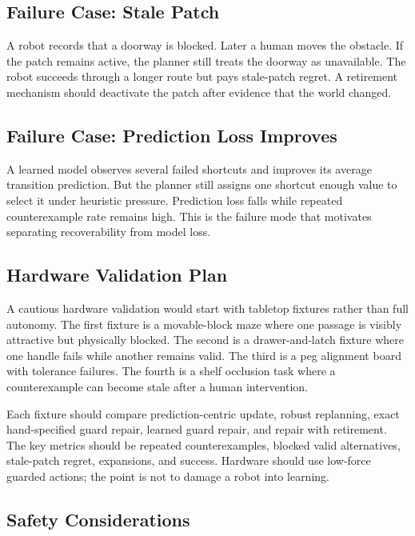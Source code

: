 \documentclass{article}
\begin{document}
\subsection{Failure Case: Stale Patch}

A robot records that a doorway is blocked. Later a human moves the obstacle. If
the patch remains active, the planner still treats the doorway as unavailable.
The robot succeeds through a longer route but pays stale-patch regret. A
retirement mechanism should deactivate the patch after evidence that the world
changed.

\subsection{Failure Case: Prediction Loss Improves}

A learned model observes several failed shortcuts and improves its average
transition prediction. But the planner still assigns one shortcut enough value
to select it under heuristic pressure. Prediction loss falls while repeated
counterexample rate remains high. This is the failure mode that motivates
separating recoverability from model loss.

\subsection{Hardware Validation Plan}

A cautious hardware validation would start with tabletop fixtures rather than
full autonomy. The first fixture is a movable-block maze where one passage is
visibly attractive but physically blocked. The second is a drawer-and-latch
fixture where one handle fails while another remains valid. The third is a peg
alignment board with tolerance failures. The fourth is a shelf occlusion task
where a counterexample can become stale after a human intervention.

Each fixture should compare prediction-centric update, robust replanning, exact
hand-specified guard repair, learned guard repair, and repair with retirement.
The key metrics should be repeated counterexamples, blocked valid alternatives,
stale-patch regret, expansions, and success. Hardware should use low-force
guarded actions; the point is not to damage a robot into learning.

\subsection{Safety Considerations}
\end{document}
